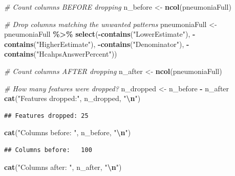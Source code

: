 \documentclass[
]{article}
\newenvironment{Shaded}{\begin{snugshade}}{\end{snugshade}}
\newcommand{\CommentTok}[1]{\textcolor[rgb]{0.56,0.35,0.01}{\textit{#1}}}
\newcommand{\FunctionTok}[1]{\textcolor[rgb]{0.13,0.29,0.53}{\textbf{#1}}}
\newcommand{\NormalTok}[1]{#1}
\newcommand{\OtherTok}[1]{\textcolor[rgb]{0.56,0.35,0.01}{#1}}
\newcommand{\SpecialCharTok}[1]{\textcolor[rgb]{0.81,0.36,0.00}{\textbf{#1}}}
\newcommand{\StringTok}[1]{\textcolor[rgb]{0.31,0.60,0.02}{#1}}
\begin{document}
\begin{Shaded}
\begin{Highlighting}[]
\CommentTok{\# Count columns BEFORE dropping}
\NormalTok{n\_before }\OtherTok{\textless{}{-}} \FunctionTok{ncol}\NormalTok{(pneumoniaFull)}

\CommentTok{\# Drop columns matching the unwanted patterns}
\NormalTok{pneumoniaFull }\OtherTok{\textless{}{-}}\NormalTok{ pneumoniaFull }\SpecialCharTok{\%\textgreater{}\%}
    \FunctionTok{select}\NormalTok{(}\SpecialCharTok{{-}}\FunctionTok{contains}\NormalTok{(}\StringTok{"LowerEstimate"}\NormalTok{),}
           \SpecialCharTok{{-}}\FunctionTok{contains}\NormalTok{(}\StringTok{"HigherEstimate"}\NormalTok{),}
           \SpecialCharTok{{-}}\FunctionTok{contains}\NormalTok{(}\StringTok{"Denominator"}\NormalTok{),}
           \SpecialCharTok{{-}}\FunctionTok{contains}\NormalTok{(}\StringTok{"HcahpsAnswerPercent"}\NormalTok{))}

\CommentTok{\# Count columns AFTER dropping}
\NormalTok{n\_after }\OtherTok{\textless{}{-}} \FunctionTok{ncol}\NormalTok{(pneumoniaFull)}

\CommentTok{\# How many features were dropped?}
\NormalTok{n\_dropped }\OtherTok{\textless{}{-}}\NormalTok{ n\_before }\SpecialCharTok{{-}}\NormalTok{ n\_after}
\FunctionTok{cat}\NormalTok{(}\StringTok{"Features dropped:"}\NormalTok{, n\_dropped, }\StringTok{"}\SpecialCharTok{\textbackslash{}n}\StringTok{"}\NormalTok{)}
\end{Highlighting}
\end{Shaded}

\begin{verbatim}
## Features dropped: 25
\end{verbatim}

\begin{Shaded}
\begin{Highlighting}[]
\FunctionTok{cat}\NormalTok{(}\StringTok{"Columns before:  "}\NormalTok{, n\_before, }\StringTok{"}\SpecialCharTok{\textbackslash{}n}\StringTok{"}\NormalTok{)}
\end{Highlighting}
\end{Shaded}

\begin{verbatim}
## Columns before:   100
\end{verbatim}

\begin{Shaded}
\begin{Highlighting}[]
\FunctionTok{cat}\NormalTok{(}\StringTok{"Columns after:   "}\NormalTok{, n\_after, }\StringTok{"}\SpecialCharTok{\textbackslash{}n}\StringTok{"}\NormalTok{)}
\end{Highlighting}
\end{Shaded}
\end{document}
